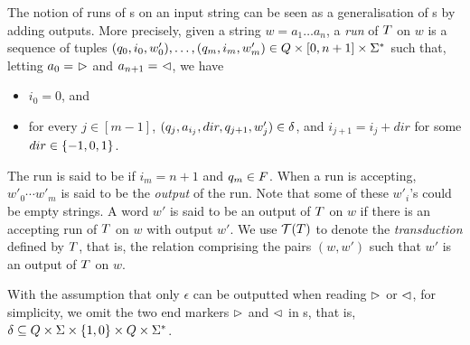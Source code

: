 The notion of runs of \FFT{}s on an input string can be seen as a generalisation 
of \FFA{}s by adding outputs. More precisely, given a string $w = a_1 \dots a_n$, a \emph{run} of $T$ on $w$
is a
sequence of tuples $(q_0, i_0, w'_0),\ldots, (q_m, i_m, w'_m) \in Q \times
[0, n+1] \times \Sigma^*$ 
such that, letting $a_0 =\ \vartriangleright$ and $a_{n+1} =\ \vartriangleleft$, 
we have %
\begin{itemize}
    \item $i_0 = 0$, and
    \item for every $j \in [m-1]$, $(q_j, a_{i_j}, dir, q_{j+1}, w'_j) \in
        \delta$, and $i_{j+1} = i_j + dir$ for some $dir \in \{-1, 0, 1\}$.
\end{itemize}
The run is said to be  if $i_m = n+1$ and $q_m \in F$.
When a run is accepting, $w'_0 \cdots w'_m$ is said to be the \emph{output} of the
run. Note that some of these $w'_i$'s could be empty strings.
A word $w'$ is said to be an output of $T$ on $w$ if there is an accepting run of
$T$ on $w$ with output $w'$. We use $\mathcal{T}(T)$ to denote the
\emph{transduction} defined by $T$, that is, the relation comprising
the pairs $(w,w')$ such that $w'$ is an output of $T$ on $w$. 

With the assumption that only $\epsilon$ can be outputted when reading $\vartriangleright$ or $\vartriangleleft$, for simplicity, we omit the two end markers $\vartriangleright$ and $\vartriangleleft$ in \FT{}s, that is, $\delta \subseteq Q \times \Sigma \times
    \{1,0\} \times Q \times \Sigma^*$.



